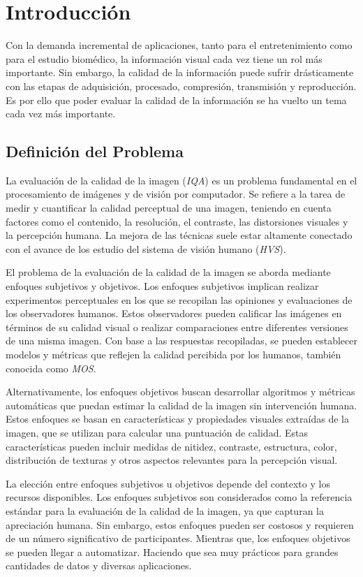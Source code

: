 \chapter{Introducción}
Con la demanda incremental de aplicaciones, tanto para el entretenimiento 
como para el estudio biomédico, la información visual cada vez tiene un rol 
más importante. Sin embargo, la calidad de la información puede sufrir drásticamente
con las etapas de adquisición, procesado, compresión, transmisión y reproducción.
Es por ello que poder evaluar la calidad de la información se ha vuelto un 
tema cada vez más importante\cite{VisualMedicalQualityBook}.
\section{Definición del Problema}   
La evaluación de la calidad de la imagen (\emph{IQA}) es un problema fundamental 
en el procesamiento de imágenes y de visión por computador. Se refiere a la 
tarea de medir y cuantificar la calidad perceptual de una imagen, 
teniendo en cuenta factores como el contenido, la resolución, 
el contraste, las distorsiones visuales y la percepción humana. 
La mejora de las técnicas suele estar altamente conectado con el avance 
de los estudio del sistema de visión humano (\emph{HVS})\cite{Wang2006ModernIQ}.
 
El problema de la evaluación de la calidad de la imagen se aborda mediante enfoques 
subjetivos y objetivos. Los enfoques subjetivos implican realizar experimentos 
perceptuales en los que se recopilan las opiniones y evaluaciones de los observadores 
humanos. Estos observadores pueden calificar las imágenes en términos de su 
calidad visual o realizar comparaciones entre diferentes versiones de una misma imagen. 
Con base a las respuestas recopiladas, se pueden establecer modelos y 
métricas que reflejen la calidad percibida por los humanos, también conocida
como \emph{MOS}\footnotemark[1].

Alternativamente, los enfoques objetivos buscan desarrollar algoritmos y métricas 
automáticas que puedan estimar la calidad de la imagen sin intervención humana. 
Estos enfoques se basan en características y propiedades visuales extraídas de la 
imagen, que se utilizan para calcular una puntuación de calidad. Estas características 
pueden incluir medidas de nitidez, contraste, estructura, color, distribución de 
texturas y otros aspectos relevantes para la percepción visual.
 
La elección entre enfoques subjetivos u objetivos depende del contexto y los 
recursos disponibles. Los enfoques subjetivos son considerados como la referencia estándar 
para la evaluación de la calidad de la imagen, ya que capturan la apreciación 
humana. Sin embargo, estos enfoques pueden ser costosos y requieren de un número 
significativo de participantes. 
Mientras que, los enfoques objetivos se pueden llegar a automatizar. Haciendo que 
sea muy prácticos para grandes cantidades de datos y diversas aplicaciones.
 
